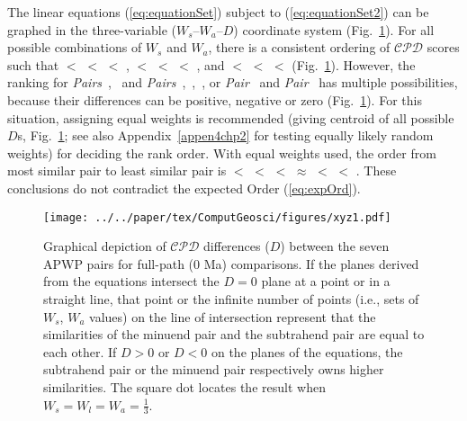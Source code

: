 The linear equations (\ref{eq:equationSet}) subject to (\ref{eq:equationSet2})
can be graphed in the three-variable ($W_s\textrm{--}W_a\textrm{--}D$)
coordinate system (Fig.~\ref{fig:pair-cmp}). For all possible combinations of
$W_s$ and $W_a$, there is a consistent ordering of $\mathcal{CPD}$ scores such
that \textbf{} $<$ \textbf{} $<$
\textbf{} $<$ \textbf{},
\textbf{} $<$ \textbf{} $<$
\textbf{} $<$ \textbf{}, and
\textbf{} $<$ \textbf{} $<$
\textbf{} $<$ \textbf{}
(Fig.~\ref{fig:pair-cmp}). However, the ranking for
\emph{Pairs}~\textbf{},~\textbf{} and
\emph{Pairs}~\textbf{},~\textbf{},~\textbf{},
or \emph{Pair}~\textbf{} and
\emph{Pair}~\textbf{} has multiple possibilities, because
their differences can be positive, negative or zero (Fig.~\ref{fig:pair-cmp}).
For this situation, assigning equal weights is recommended (giving centroid of
all possible $D$s, Fig.~\ref{fig:pair-cmp}; see also Appendix~\ref{appen4chp2}
for testing equally likely random weights) for deciding the rank order. With
equal weights used, the order from most similar pair to least similar pair is
\textbf{} $<$ \textbf{} $<$
\textbf{} $<$ \textbf{} $\approx$
\textbf{} $<$ \textbf{} $<$
\textbf{}.
These conclusions do not contradict the expected Order (\ref{eq:expOrd}).

\begin{figure}[tbp]
  \texttt{[image: ../../paper/tex/ComputGeosci/figures/xyz1.pdf]}
\end{figure}
\begin{figure}[!ht]
  \addtocounter{figure}{1}
  \ContinuedFloat\caption[Criteria of pair comparisons]{Graphical depiction of $\mathcal{CPD}$
    differences ($D$) between the seven APWP pairs for full-path (0
    Ma) comparisons. If the planes derived from the equations intersect the $D=0$
    plane at a point or in a straight line, that point or the infinite number of
    points (i.e., sets of $W_s$, $W_a$ values) on the line of intersection represent
    that the similarities of the minuend pair and the subtrahend pair are equal to
    each other. If $D>0$ or $D<0$ on the planes of the equations, the subtrahend
    pair or the minuend pair respectively owns higher similarities. The square dot
    locates the result when $W_s=W_l=W_a=\frac{1}{3}$.}\label{fig:pair-cmp}
\end{figure}


